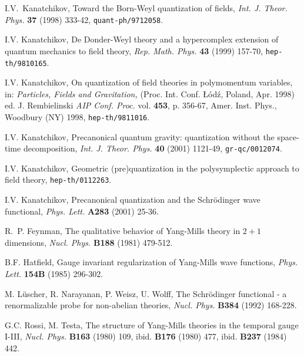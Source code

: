 \documentclass[12pt]{article}
\begin{document}
\begin{thebibliography}{99}
 I.V.~Kanatchikov, 
{ Toward the Born-Weyl quantization of fields, }
{\em Int. J. Theor. Phys.\/} {\bf 37}  (1998) 333-42,   
{\tt quant-ph/9712058}. 

  I.V. Kanatchikov,  
{De Donder-Weyl theory and a hypercomplex 
extension of quantum mechanics to field theory, } 
 {\em Rep. Math. Phys.\/} {\bf 43} (1999) 157-70,    
{\tt hep-th/9810165}.   

 I.V. Kanatchikov,  
On quantization of field theories in polymomentum variables,    
in: 
{\sl Particles, Fields and Gravitation, }   
 (Proc. Int. Conf. \L\'od\'z, Poland, Apr. 1998)   
 ed.  J. Rembielinski    
{\em AIP Conf. Proc.\/} vol. {\bf 453}, p. 356-67,     
Amer. Inst. Phys., Woodbury (NY) 1998, 
  {\tt hep-th/9811016}. 

 I.V. Kanatchikov, 
Precanonical quantum gravity: quantization without 
the space-time decomposition, 
{\em Int. J. Theor. Phys.\/} {\bf 40} (2001) 1121-49,  
{\tt gr-qc/0012074}.  
 
 I.V. Kanatchikov, 
Geometric (pre)quantization in the polysymplectic 
approach to field theory, 
{\tt hep-th/0112263}. 





 I.V. Kanatchikov, 
Precanonical quantization and the 
Schr\"odinger wave functional, 
{\em Phys. Lett.} {\bf A283} (2001) 25-36. 






 R.~P. Feynman, 
The qualitative behavior of Yang-Mills theory in $2+1$ 
dimensions, {\em Nucl. Phys.} {\bf B188} (1981) 479-512.

 B.F. Hatfield, Gauge invariant regularization 
of Yang-Mills wave functions, {\em Phys. Lett.} {\bf 154B} (1985) 296-302.

 M. L\"uscher, R. Narayanan, P. Weisz, U. Wolff, 
The Schr\"odinger functional - a renormalizable 
probe for non-abelian theories, 
 {\em Nucl. Phys.} {\bf B384} (1992) 168-228.

 G.C. Rossi, M. Testa, 
The structure of Yang-Mills theories in the 
temporal gauge I-III, %
{\em Nucl. Phys.} {\bf B163} (1980) 109, 
ibid. {\bf B176} (1980) 477, %
ibid. {\bf B237} (1984) 442. %
 


\end{thebibliography}
\end{document}

